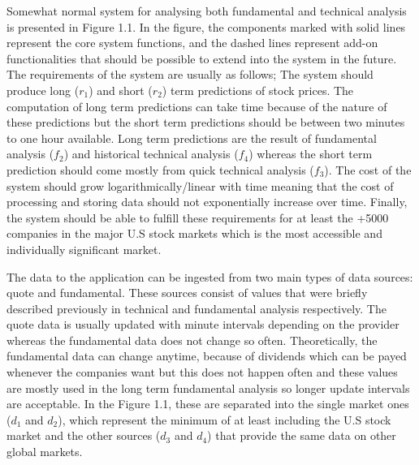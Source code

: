 
Somewhat normal system for analysing both fundamental and technical analysis is presented in Figure 1.1.
In the figure, the components marked with solid lines represent the core system functions, and the dashed lines represent add-on functionalities that should be possible to extend into the system in the future.
The requirements of the system are usually as follows;
The system should produce long ($r_1$) and short ($r_2$) term predictions of stock prices.
The computation of long term predictions can take time because of the nature of these predictions but the short term predictions should be between two minutes to one hour available.
Long term predictions are the result of fundamental analysis ($f_2$) and historical technical analysis ($f_4$) whereas the short term prediction should come mostly from quick technical analysis ($f_3$).
The cost of the system should grow logarithmically/linear with time meaning that the cost of processing and storing data should not exponentially increase over time.
Finally, the system should be able to fulfill these requirements for at least the +5000 companies in the major U.S stock markets which is the most accessible and individually significant market.

The data to the application can be ingested from two main types of data sources: quote and fundamental.
These sources consist of values that were briefly described previously in technical and fundamental analysis respectively.
The quote data is usually updated with minute intervals depending on the provider whereas the fundamental data does not change so often.
Theoretically, the fundamental data can change anytime, because of dividends which can be payed whenever the companies want but this does not happen often and these values are mostly used in the long term fundamental analysis so longer update intervals are acceptable.
In the Figure 1.1, these are separated into the single market ones ($d_1$ and $d_2$), which represent the minimum of at least including the U.S stock market and the other sources ($d_3$ and $d_4$) that provide the same data on other global markets.

